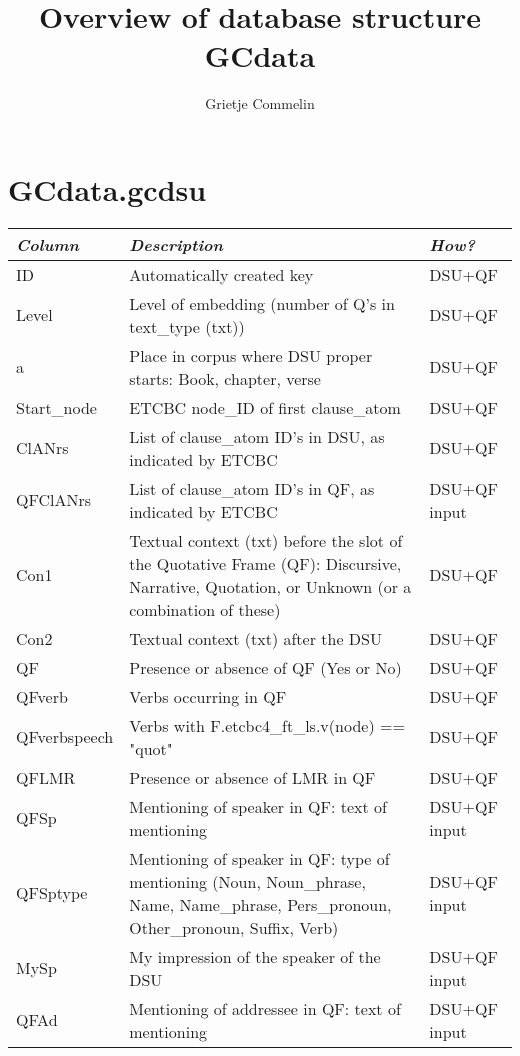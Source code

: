 \documentclass{article}
\title{Overview of database structure GCdata}
\author{Grietje Commelin}
\begin{document}
\maketitle

\section{GCdata.gcdsu}


\begin{longtable}{|l|p{}|l|}
\hline
\emph{Column} & \emph{Description} & \emph{How?}\\ \hline
ID          & Automatically created key & DSU+QF \\ \hline
Level       & Level of embedding (number of Q's in text\_type (txt)) & DSU+QF \\ \hline
a           & Place in corpus where DSU proper starts: Book, chapter, verse & DSU+QF \\ \hline
Start\_node & ETCBC node\_ID of first clause\_atom & DSU+QF \\ \hline
ClANrs      & List of clause\_atom ID's in DSU, as indicated by ETCBC & DSU+QF \\ \hline
QFClANrs    & List of clause\_atom ID's in QF, as indicated by ETCBC & DSU+QF input \\ \hline
Con1        & Textual context (txt) before the slot of the Quotative Frame (QF): Discursive, Narrative, Quotation, or Unknown (or a combination of these) & DSU+QF \\ \hline
Con2        & Textual context (txt) after the DSU & DSU+QF \\ \hline
QF          & Presence or absence of QF (Yes or No) & DSU+QF \\ \hline
QFverb      & Verbs occurring in QF & DSU+QF \\ \hline
QFverbspeech & Verbs with F.etcbc4\_ft\_ls.v(node) == "quot" & DSU+QF \\ \hline
QFLMR       & Presence or absence of LMR in QF & DSU+QF \\ \hline
QFSp        & Mentioning of speaker in QF: text of mentioning & DSU+QF input \\ \hline
QFSptype    & Mentioning of speaker in QF: type of mentioning (Noun, Noun\_phrase, Name, Name\_phrase, Pers\_pronoun, Other\_pronoun, Suffix, Verb) & DSU+QF input \\ \hline
MySp        & My impression of the speaker of the DSU & DSU+QF input \\ \hline
QFAd        & Mentioning of addressee in QF: text of mentioning & DSU+QF input \\ \hline

\end{longtable}
\end{document}
